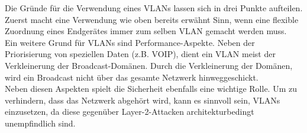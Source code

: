 Die Gründe für die Verwendung eines VLANs lassen sich in drei Punkte aufteilen.
Zuerst macht eine Verwendung wie oben bereits erwähnt Sinn, wenn eine flexible Zuordnung eines Endgerätes immer zum selben VLAN gemacht werden muss.\\
Ein weitere Grund für VLANs sind Performance-Aspekte. Neben der Priorisierung von speziellen Daten (z.B. VOIP), dient ein VLAN meist der Verkleinerung der Broadcast-Domänen.
Durch die Verkleinerung der Domänen, wird ein Broadcast nicht über das gesamte Netzwerk hinweggeschickt.\\
Neben diesen Aspekten spielt die Sicherheit ebenfalls eine wichtige Rolle.
Um zu verhindern, dass das Netzwerk abgehört wird, kann es sinnvoll sein, VLANs einzusetzen, da diese gegenüber Layer-2-Attacken architekturbedingt unempfindlich sind.


